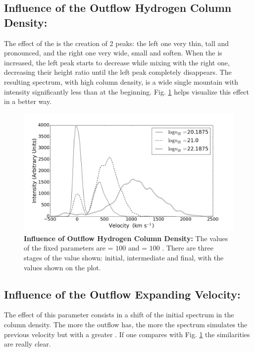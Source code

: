 \subsection{Influence of the Outflow Hydrogen Column Density: \lognh }

The effect of the \lognh is the creation of 2 peaks: the left one very thin, tall and pronounced, and the right one very wide, small and soften. When the \lognh is increased, the left peak starts to decrease while mixing with the right one, decreasing their height ratio until the left peak completely disappears. The resulting spectrum, with high column density, is a wide single mountain with intensity significantly less than at the beginning. Fig. \ref{fig:influence_lognH} helps visualize this effect in a better way.\\

\begin{figure}[h!]
	\begin{center}
		\includegraphics[width=1\textwidth]{./figures/appendix/inf_lognh_soft.png}
	\end{center}
	\caption{\textbf{Influence of Outflow Hydrogen Column Density:} The values of the fixed parameters are \vout = $100$ \kms and \vrot = $100$ \kms. There are three stages of the \lognh value shown: initial, intermediate and final, with the values shown on the plot.}
	\label{fig:influence_lognH}
\end{figure}

\subsection{Influence of the Outflow Expanding Velocity: \vout }

The effect of this parameter consists in a shift of the initial spectrum in the column density. The more \vout the outflow has, the more the spectrum simulates the previous velocity but with a greater \lognh. If one compares with Fig. \ref{fig:influence_lognH} the similarities are really clear. \\

